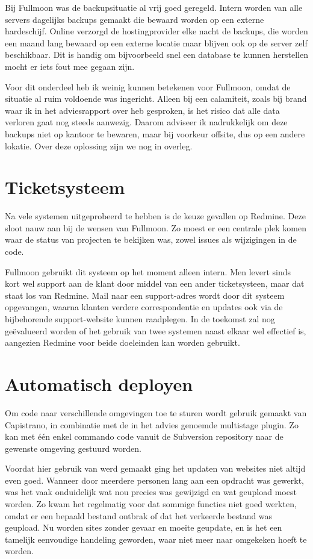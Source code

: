 Bij Fullmoon was de backupsituatie al vrij goed geregeld. Intern worden van alle servers dagelijks backups gemaakt die bewaard worden op een externe hardeschijf. Online verzorgd de hostingprovider elke nacht de backups, die worden een maand lang bewaard op een externe locatie maar blijven ook op de server zelf beschikbaar. Dit is handig om bijvoorbeeld snel een database te kunnen herstellen mocht er iets fout mee gegaan zijn.

Voor dit onderdeel heb ik weinig kunnen betekenen voor Fullmoon, omdat de situatie al ruim voldoende was ingericht. Alleen bij een calamiteit, zoals bij brand waar ik in het adviesrapport over heb gesproken, is het risico dat alle data verloren gaat nog steeds aanwezig. Daarom adviseer ik nadrukkelijk om deze backups niet op kantoor te bewaren, maar bij voorkeur offsite, dus op een andere lokatie. Over deze oplossing zijn we nog in overleg.

\section{Ticketsysteem}

Na vele systemen uitgeprobeerd te hebben is de keuze gevallen op Redmine. Deze sloot nauw aan bij de wensen van Fullmoon. Zo moest er een centrale plek komen waar de status van projecten te bekijken was, zowel issues als wijzigingen in de code.

Fullmoon gebruikt dit systeem op het moment alleen intern. Men levert sinds kort wel support aan de klant door middel van een ander ticketsysteen, maar dat staat los van Redmine. Mail naar een support-adres wordt door dit systeem opgevangen, waarna klanten verdere correspondentie en updates ook via de bijbehorende support-website kunnen raadplegen. In de toekomst zal nog geëvalueerd worden of het gebruik van twee systemen naast elkaar wel effectief is, aangezien Redmine voor beide doeleinden kan worden gebruikt.

\section{Automatisch deployen}

Om code naar verschillende omgevingen toe te sturen wordt gebruik gemaakt van Capistrano, in combinatie met de in het advies genoemde multistage plugin. Zo kan met één enkel commando code vanuit de Subversion repository naar de gewenste omgeving gestuurd worden.

Voordat hier gebruik van werd gemaakt ging het updaten van websites niet altijd even goed. Wanneer door meerdere personen lang aan een opdracht was gewerkt, was het vaak onduidelijk wat nou precies was gewijzigd en wat geupload moest worden. Zo kwam het regelmatig voor dat sommige functies niet goed werkten, omdat er een bepaald bestand ontbrak of dat het verkeerde bestand was geupload. Nu worden sites zonder gevaar en moeite geupdate, en is het een tamelijk eenvoudige handeling geworden, waar niet meer naar omgekeken hoeft te worden.

